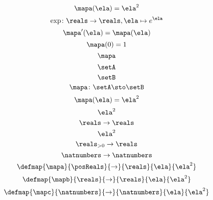 \begin{forslides}
    \begin{equation}
        \label{eq:slides_session2_76}
        \mapa(\ela)=\ela^2
    \end{equation}
    \begin{equation}
        \label{eq:slides_session2_77}
        \exp \colon \reals \to \reals, \ela \mapsto e^\ela
    \end{equation}
    \begin{equation}
        \label{eq:slides_session2_78}
        \mapa'(\ela) = \mapa(\ela)
    \end{equation}
    \begin{equation}
        \label{eq:slides_session2_79}
        \mapa(0) =1
    \end{equation}
    \begin{equation}
        \label{eq:slides_session2_80}
        \mapa
    \end{equation}
    \begin{equation}
        \label{eq:slides_session2_81}
        \setA
    \end{equation}
    \begin{equation}
        \label{eq:slides_session2_82}
        \setB
    \end{equation}
    \begin{equation}
        \label{eq:slides_session2_83}
        \mapa\colon \setA \sto \setB
    \end{equation}
    \begin{equation}
        \label{eq:slides_session2_84}
        \mapa(\ela)=\ela^2
    \end{equation}
    \begin{equation}
        \label{eq:slides_session2_85}
        \ela^2
    \end{equation}
    \begin{equation}
        \label{eq:slides_session2_86}
        \reals \to \reals
    \end{equation}
    \begin{equation}
        \label{eq:slides_session2_87}
        \ela^2
    \end{equation}
    \begin{equation}
        \label{eq:slides_session2_88}
        \reals_{> 0} \to \reals
    \end{equation}
    \begin{equation}
        \label{eq:slides_session2_89}
        \natnumbers \to \natnumbers
    \end{equation}
    \begin{equation}
        \label{eq:slides_session2_90}
        \defmap{\mapa}{\posReals}{\to}{\reals}{\ela}{\ela^2}
    \end{equation}
    \begin{equation}
        \label{eq:slides_session2_91}
        \defmap{\mapb}{\reals}{\to}{\reals}{\ela}{\ela^2}
    \end{equation}
    \begin{equation}
        \label{eq:slides_session2_92}
        \defmap{\mapc}{\natnumbers}{\to}{\natnumbers}{\ela}{\ela^2}
    \end{equation}


\end{forslides}
